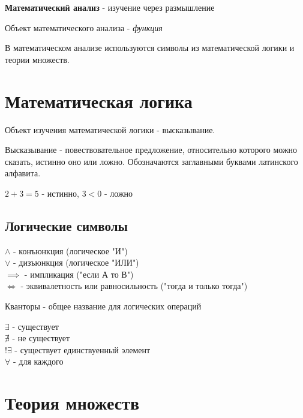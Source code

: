 
\textbf{Математический анализ} - изучение через размышление

Объект математического анализа - \textit{функция}

В математическом анализе используются символы из математической логики и теории множеств.

\section{Математическая логика}

Объект изучения математической логики - высказывание.

\begin{definition}
  Высказывание - повествовательное предложение, относительно которого можно сказать, истинно оно или ложно. Обозначаются заглавными буквами латинского алфавита.
\end{definition}
\begin{eg}
  $2+3=5$ - истинно, $3 < 0$ - ложно
\end{eg}

\subsection{Логические символы}

\begin{itemize}
  $\land$ - конъюнкция (логическое "И")\\
  $\lor$ - дизъюнкция (логическое "ИЛИ")\\
  $\implies$ - импликация ("если А то В")\\
  $\iff$ - эквивалетность или равносильность ("тогда и только тогда")\\
\end{itemize}

Кванторы - общее название для логических операций

\begin{itemize}
  $\exists$ - существует\\
  $\nexists$ - не существует\\
  $!\exists$ - существует единствуенный элемент\\
  $\forall$ - для каждого\\
\end{itemize}

\section{Теория множеств}

